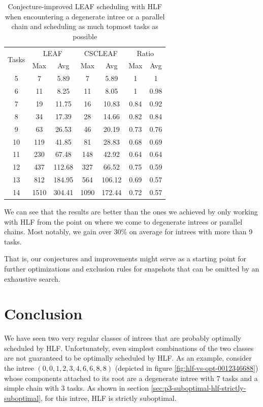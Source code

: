 \begin{table}[th]
  \centering
  \begin{tabular}[ht]{ccccccc}
    \multirow{2}{*}{Tasks} & \multicolumn{2}{c}{LEAF} & \multicolumn{2}{c}{CSCLEAF} & \multicolumn{2}{c}{Ratio}\\
    &  Max & Avg & Max & Avg & Max & Avg\\
    \hline
    5 & 7 & 5.89 & 7 & 5.89 & 1 & 1\\
    6 & 11 & 8.25 & 11 & 8.05 & 1 & 0.98\\
    7 & 19 & 11.75 & 16 & 10.83 & 0.84 & 0.92 \\
    8 & 34 & 17.39 & 28 & 14.66 & 0.82 & 0.84 \\
    9 & 63 & 26.53 & 46 & 20.19 & 0.73 & 0.76 \\
    10 & 119 & 41.85 & 81 & 28.83 & 0.68 & 0.69 \\
    11 & 230 & 67.48 & 148 & 42.92 & 0.64 & 0.64 \\
    12 & 437 & 112.68 & 327 & 66.52 & 0.75 & 0.59 \\
    13 & 812 & 184.95 & 564 & 106.12 & 0.69 & 0.57 \\
    14 & 1510 & 304.41 & 1090 & 172.44 & 0.72 & 0.57 \\
  \end{tabular}
  \caption{Conjecture-improved LEAF scheduling with HLF when encountering a degenerate intree or a parallel chain and scheduling as much topmost tasks as possible}
  \label{tab:improving-improved-leaf-scheduler-benchmark}
\end{table}

We can see that the results are better than the ones we achieved by only working with HLF from the point on where we come to degenerate intrees or parallel chains. Most notably, we gain over 30\% on average for intrees with more than 9 tasks.

That is, our conjectures and improvements might serve as a starting point for further optimizations and exclusion rules for snapshots that can be omitted by an exhaustive search.

\section{Conclusion}
\label{sec:properties-schedules-conclusion}

We have seen two very regular classes of intrees that are probably optimally scheduled by HLF. Unfortunately, even simplest combinations of the two classes are not guaranteed to be optimally scheduled by HLF. As an example, consider the intree $(0,0,1,2,3,4,6,6,8,8)$ (depicted in figure \ref{fig:hlf-vs-opt-0012346688}) whose components attached to its root are a degenerate intree with 7 tasks and a simple chain with 3 tasks. As shown in section \ref{sec:p3-suboptimal-hlf-strictly-suboptimal}, for this intree, HLF is strictly suboptimal.

